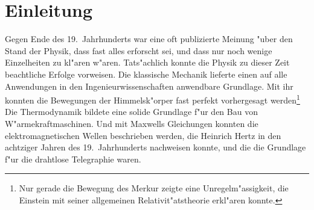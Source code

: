 \chapter{Einleitung\label{chapter:einleitung}}
\rhead{}

Gegen Ende des 19.~Jahrhunderts war eine oft publizierte Meinung 
"uber den Stand der Physik, dass fast alles erforscht sei, und dass
nur noch wenige Einzelheiten zu kl"aren w"aren.
Tats"achlich konnte die Physik zu dieser Zeit beachtliche Erfolge 
vorweisen.
Die klassische Mechanik lieferte einen auf alle Anwendungen in den
Ingenieurwissenschaften anwendbare Grundlage.
Mit ihr konnten die Bewegungen der Himmelsk"orper fast perfekt
vorhergesagt werden\footnote{
Nur gerade die Bewegung des Merkur zeigte eine Unregelm"assigkeit, die
Einstein mit seiner allgemeinen Relativit"atstheorie erkl"aren konnte.}
Die Thermodynamik bildete eine solide Grundlage f"ur den Bau von
W"armekraftmaschinen.
Und mit Maxwells Gleichungen konnten 
die elektromagnetischen Wellen beschrieben werden, die Heinrich
Hertz in den achtziger Jahren des 19.~Jahrhunderts nachweisen konnte,
und die die Grundlage f"ur die drahtlose Telegraphie waren.

